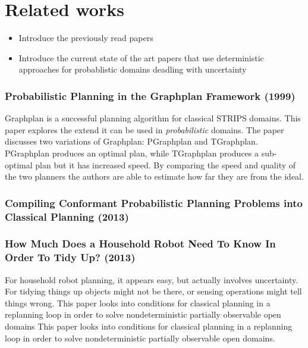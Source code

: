 \documentclass[runningheads,a4paper]{llncs}
\begin{document}

\section{Related works}

\begin{itemize}
	\item Introduce the previously read papers
	\item Introduce the current state of the art papers that use deterministic approaches for probablistic domains deadling with uncertainty
\end{itemize}

\subsubsection{Probabilistic Planning in the Graphplan Framework (1999)~\cite{Blum99probabilisticplanning}}

Graphplan is a successful planning algorithm for classical STRIPS domains. This
paper explores the extend it can be used in \emph{probabilistic} domains. The
paper discusses two variations of Graphplan: PGraphplan and TGraphplan.
PGraphplan produces an optimal plan, while TGraphplan produces a sub-optimal
plan but it has increased speed. By comparing the speed and quality of the
two planners the authors are able to estimate how far they are from the ideal.

\subsubsection{Compiling Conformant Probabilistic Planning Problems into Classical Planning (2013)~\cite{taig2013conformant}}


\subsubsection{How Much Does a Household Robot Need To Know In Order To Tidy Up? (2013)~\cite{nebel2013much}}

For household robot planning, it appears easy, but actually involves
uncertainty. For tidying things up objects might not be there, or sensing
operations might tell things wrong. This paper looks into conditions for
classical planning in a replanning loop in order to solve nondeterministic
partially observable open domains This paper looks into conditions for
classical planning in a replanning loop in order to solve nondeterministic
partially observable open domains.
\end{document}
